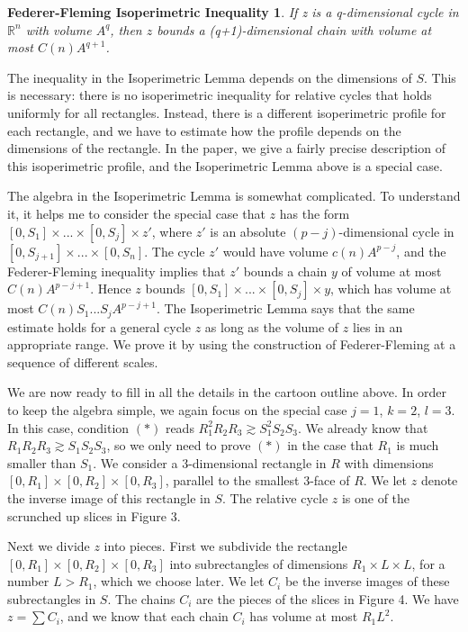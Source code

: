 \documentclass{amsart}
\newtheorem*{Theorem 1}{Theorem 1}
\newtheorem*{Theorem 2}{Theorem 2}
\newtheorem*{fedflem}{Federer-Fleming Isoperimetric Inequality}
\newtheorem*{Estimate 1}{Estimate 1}
\newtheorem*{Estimate 2}{Estimate 2}
\newtheorem*{key lemma}{Key Lemma}
\numberwithin{equation}{section}
\begin{document}
\begin{fedflem} If z is a q-dimensional cycle in
$\mathbb{R}^n$ with volume $A^q$, then $z$ bounds a
(q+1)-dimensional chain with volume at most $C(n) A^{q+1}$.
\end{fedflem}

The inequality in the Isoperimetric Lemma depends on the dimensions of $S$.
This is necessary: there is no isoperimetric inequality for relative
cycles that holds uniformly for all rectangles.  Instead, there is a different
isoperimetric profile for each rectangle, and we have to estimate how
the profile depends on the dimensions of the rectangle.  In the paper,
we give a fairly precise description of this isoperimetric profile,
and the Isoperimetric Lemma above is a special case.

The algebra in the Isoperimetric Lemma is somewhat complicated. 
To understand it, it helps me to consider the special case that
$z$ has the form $[0, S_1] \times ... \times [0, S_j] \times z'$,
where $z'$ is an absolute $(p-j)$-dimensional cycle in $[0,
S_{j+1}]
\times ... \times [0, S_n]$.  The cycle $z'$ would have volume
$c(n) A^{p-j}$, and the Federer-Fleming inequality implies that
$z'$ bounds a chain $y$ of volume at most $C(n) A^{p-j+1}$. 
Hence $z$ bounds $[0, S_1] \times ... \times [0, S_j] \times y$,
which has volume at most $C(n) S_1 ... S_j A^{p-j+1}$.  The
Isoperimetric Lemma says that the same estimate holds for a
general cycle $z$ as long as the volume of $z$ lies in an
appropriate range.  We prove it by using the construction of
Federer-Fleming at a sequence of different scales.

We are now ready to fill in all the details in the cartoon
outline above.  In order to keep the algebra simple, we again
focus on the special case $j=1$, $k=2$, $l=3$.  In this case,
condition $(*)$ reads $R_1^2 R_2 R_3
\gtrsim S_1^2 S_2 S_3$.  We already know that $R_1 R_2 R_3 \gtrsim
S_1 S_2 S_3$, so we only need to prove $(*)$ in the case that $R_1$ is
much smaller than $S_1$.  We consider a 3-dimensional rectangle
in $R$ with dimensions $[0, R_1] \times [0, R_2] \times [0,
R_3]$, parallel to the smallest 3-face of $R$.  We let $z$ denote
the inverse image of this rectangle in $S$.  The relative cycle
$z$ is one of the scrunched up slices in Figure 3.

Next we divide $z$ into pieces.  First we subdivide the rectangle
$[0, R_1] \times [0, R_2] \times [0, R_3]$ into subrectangles of
dimensions $R_1 \times L \times L$, for a number $L > R_1$, which
we choose later.  We let $C_i$ be the inverse images of these
subrectangles in $S$.  The chains $C_i$ are the pieces of the
slices in Figure 4.  We have $z = \sum C_i$, and we know that
each chain $C_i$ has volume at most $R_1 L^2$. 
\end{document}
